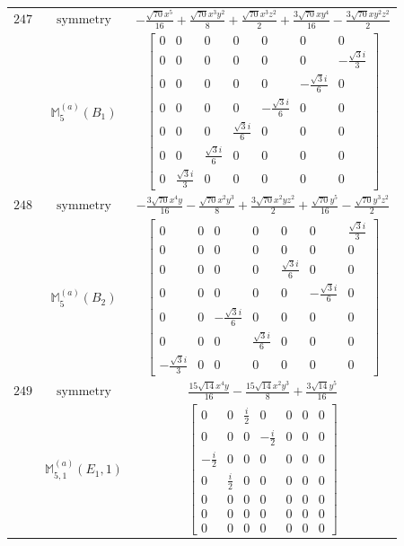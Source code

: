 \documentclass[fleqn,8pt,landscape]{jsarticle}
\begin{document}
\begin{longtable}{ccc}
$ 247 $ & $ \text{symmetry} $ & $ - \frac{\sqrt{70} x^{5}}{16} + \frac{\sqrt{70} x^{3} y^{2}}{8} + \frac{\sqrt{70} x^{3} z^{2}}{2} + \frac{3 \sqrt{70} x y^{4}}{16} - \frac{3 \sqrt{70} x y^{2} z^{2}}{2} $ \\
$  $ & $ \mathbb{M}_{5}^{(a)}(B_{1}) $ & $ \begin{bmatrix} 0 & 0 & 0 & 0 & 0 & 0 & 0 \\ 0 & 0 & 0 & 0 & 0 & 0 & - \frac{\sqrt{3} i}{3} \\ 0 & 0 & 0 & 0 & 0 & - \frac{\sqrt{3} i}{6} & 0 \\ 0 & 0 & 0 & 0 & - \frac{\sqrt{3} i}{6} & 0 & 0 \\ 0 & 0 & 0 & \frac{\sqrt{3} i}{6} & 0 & 0 & 0 \\ 0 & 0 & \frac{\sqrt{3} i}{6} & 0 & 0 & 0 & 0 \\ 0 & \frac{\sqrt{3} i}{3} & 0 & 0 & 0 & 0 & 0 \end{bmatrix} $ \\ \hline
$ 248 $ & $ \text{symmetry} $ & $ - \frac{3 \sqrt{70} x^{4} y}{16} - \frac{\sqrt{70} x^{2} y^{3}}{8} + \frac{3 \sqrt{70} x^{2} y z^{2}}{2} + \frac{\sqrt{70} y^{5}}{16} - \frac{\sqrt{70} y^{3} z^{2}}{2} $ \\
$  $ & $ \mathbb{M}_{5}^{(a)}(B_{2}) $ & $ \begin{bmatrix} 0 & 0 & 0 & 0 & 0 & 0 & \frac{\sqrt{3} i}{3} \\ 0 & 0 & 0 & 0 & 0 & 0 & 0 \\ 0 & 0 & 0 & 0 & \frac{\sqrt{3} i}{6} & 0 & 0 \\ 0 & 0 & 0 & 0 & 0 & - \frac{\sqrt{3} i}{6} & 0 \\ 0 & 0 & - \frac{\sqrt{3} i}{6} & 0 & 0 & 0 & 0 \\ 0 & 0 & 0 & \frac{\sqrt{3} i}{6} & 0 & 0 & 0 \\ - \frac{\sqrt{3} i}{3} & 0 & 0 & 0 & 0 & 0 & 0 \end{bmatrix} $ \\ \hline
$ 249 $ & $ \text{symmetry} $ & $ \frac{15 \sqrt{14} x^{4} y}{16} - \frac{15 \sqrt{14} x^{2} y^{3}}{8} + \frac{3 \sqrt{14} y^{5}}{16} $ \\
$  $ & $ \mathbb{M}_{5,1}^{(a)}(E_{1},1) $ & $ \begin{bmatrix} 0 & 0 & \frac{i}{2} & 0 & 0 & 0 & 0 \\ 0 & 0 & 0 & - \frac{i}{2} & 0 & 0 & 0 \\ - \frac{i}{2} & 0 & 0 & 0 & 0 & 0 & 0 \\ 0 & \frac{i}{2} & 0 & 0 & 0 & 0 & 0 \\ 0 & 0 & 0 & 0 & 0 & 0 & 0 \\ 0 & 0 & 0 & 0 & 0 & 0 & 0 \\ 0 & 0 & 0 & 0 & 0 & 0 & 0 \end{bmatrix} $ \\ \hline

\end{longtable}
\end{document}
